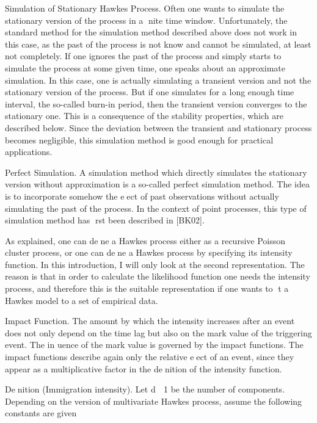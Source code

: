\documentclass[11pt]{book}
\begin{document}
Simulation of Stationary Hawkes Process. Often one wants to simulate
the stationary version of the process in a nite time window. Unfortunately,
the standard method for the simulation method described above does not work
in this case, as the past of the process is not know and cannot be simulated,
at least not completely.
If one ignores the past of the process and simply starts to simulate the
process at some given time, one speaks about an approximate simulation. In
this case, one is actually simulating a transient version and not the stationary
version of the process. But if one simulates for a long enough time interval, the
so-called burn-in period, then the transient version converges to the stationary
one. This is a consequence of the stability properties, which are described below.
Since the deviation between the transient and stationary process becomes
negligible, this simulation method is good enough for practical applications.

Perfect Simulation. A simulation method which directly simulates the stationary
version without approximation is a so-called perfect simulation method.
The idea is to incorporate somehow the eect of past observations without actually
simulating the past of the process. In the context of point processes, this
type of simulation method has rst been described in [BK02].




As explained, one can dene a Hawkes process
either as a recursive Poisson cluster process, or one can dene a Hawkes process
by specifying its intensity function. In this introduction, I will only look at the
second representation. The reason is that in order to calculate the likelihood
function one needs the intensity process, and therefore this is the suitable
representation if one wants to t a Hawkes model to a set of empirical data.



Impact Function. The amount by which the intensity increases after an
event does not only depend on the time lag but also on the mark value of
the triggering event. The in
uence of the mark value is governed by the impact
functions. The impact functions describe again only the relative eect of
an event, since they appear as a multiplicative factor in the denition of the
intensity function.

Denition (Immigration intensity). Let d  1 be the number of components.
Depending on the version of multivariate Hawkes process, assume the
following constants are given
\end{document}
